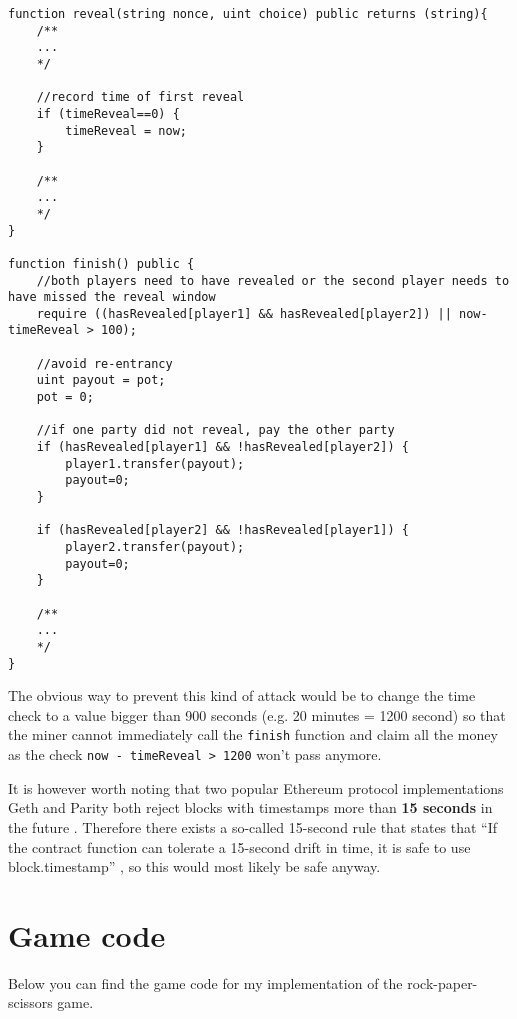 \documentclass{article}
\begin{document}
    \begin{lstlisting}[language=Solidity]
function reveal(string nonce, uint choice) public returns (string){
    /**
    ...
    */
    
    //record time of first reveal
    if (timeReveal==0) {
        timeReveal = now;
    }

    /**
    ...
    */
}

function finish() public {
    //both players need to have revealed or the second player needs to have missed the reveal window
    require ((hasRevealed[player1] && hasRevealed[player2]) || now-timeReveal > 100);
    
    //avoid re-entrancy
    uint payout = pot;
    pot = 0;
    
    //if one party did not reveal, pay the other party
    if (hasRevealed[player1] && !hasRevealed[player2]) {
        player1.transfer(payout);
        payout=0;
    }
    
    if (hasRevealed[player2] && !hasRevealed[player1]) {
        player2.transfer(payout);
        payout=0;
    }

    /**
    ...
    */
}
    \end{lstlisting}

    \noindent The obvious way to prevent this kind of attack
    would be to change the time check to a value bigger than
    900 seconds (e.g. 20 minutes = 1200 second) so that the
    miner cannot immediately call the \verb|finish| function
    and claim all the money as the check \verb|now - timeReveal > 1200| 
    won't pass anymore.
    \newline

    \noindent It is however worth noting that two popular
    Ethereum protocol implementations Geth and Parity both
    reject blocks with timestamps more than {\bfseries 15
    seconds} in the future \cite{ethsecu, geth, parity}.
    Therefore there exists a so-called 15-second rule that
    states that ``If the contract function can tolerate a
    15-second drift in time, it is safe to use
    block.timestamp'' \cite{ethsecu}, so this would most
    likely be safe anyway.

    \section{Game code} \label{s:code}
    Below you can find the game code for my implementation
    of the rock-paper-scissors game.
    
\end{document}
